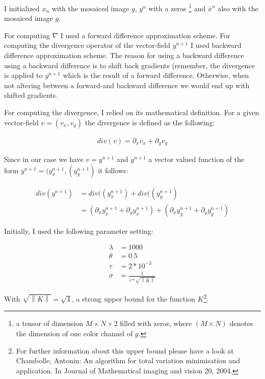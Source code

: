 \documentclass{paper}
\newcommand{\norm}[1]{\left\lVert#1\right\rVert}
\begin{document}
I initialized $x_n$ with the mosaiced image $g$, $y^{n}$ with a zeros \footnote{a tensor of dimension $M \times N \times 2$ filled with zeros, where $(M \times N)$ denotes the dimension of one color channel of $g$.} and $\bar{x}^{n}$ also with the mosaiced image $g$.

For computing $\nabla$ I used a forward difference approximation scheme. For computing the divergence operator of the vector-field $y^{n+1}$ I used backward difference approximation scheme. The reason for using a backward difference using a backward difference is to shift back gradients (remember, the divergence is applied to $y^{n+1}$ which is the result of a forward difference. Otherwise, when not altering between a forward-and backward difference we would end up with shifted gradients.

For computing the divergence, I relied on its mathematical definition. For a given vector-field $v = (v_x, v_y)$ the divergence is defined as the following:

\begin{align}
	div(v) = \partial_x v_x + \partial_y v_y
\end{align}

Since in our case we have $v = y^{n+1}$ and $y^{n+1}$ a vector valued function of the form $y^{n+1} = (y_{x}^{n+1}, (y_{y}^{n+1})$ it follows:

\begin{align}
	div(y^{n+1}) 
	&= div((y_{x}^{n+1}) + div((y_{y}^{n+1}) \\
	&= \left( \partial_x y_{x}^{n+1} + \partial_y y_{x}^{n+1} \right) + \left( \partial_x y_{y}^{n+1} + \partial_y y_{y}^{n+1} \right)
\end{align}

Initially, I used the following parameter setting:

\begin{align}
	\lambda &= 1000 \\
	\theta &= 0.5 \\
	\tau &= 2*10^{-3} \\
	\sigma &= \frac{1}{\tau * \sqrt{\norm{K}}}
\label{eq:parameter_set_up}	
\end{align}

With $\sqrt{\norm{K}} = \sqrt{4}$, a strong upper bound for the function $K$\footnote{For further information about this upper bound please have a look at Chambolle, Antonin: An algorithm for total variation minimisation and application. In Journal of Mathematical imaging and vision 20, 2004.}.
\end{document}
